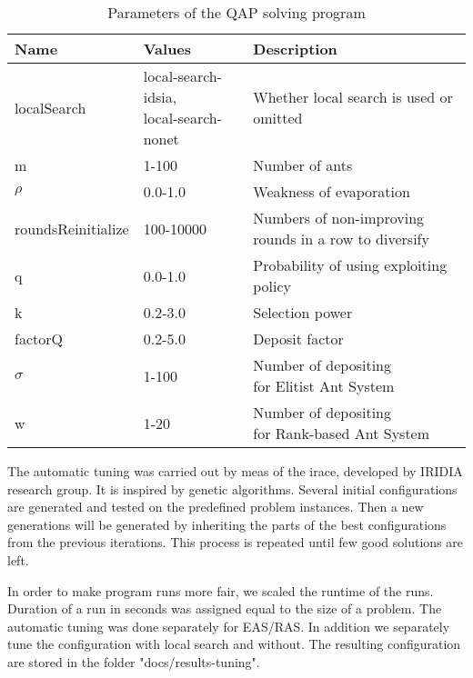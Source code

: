 \documentclass[12pt]{article}
\begin{document}
\begin{table}[H]
\centering
\caption{Parameters of the QAP solving program}
\label{tbl:parameters}
\begin{tabular}{|l|l|l|}
\hline
\textbf{Name}         & \textbf{Values}                       & \textbf{Description}                                  \\ \hline
localSearch           & \makecell{local-search-idsia,\\ local-search-nonet} & Whether local search is used or omitted               \\ \hline
m                     & 1-100                                 & Number of ants                                        \\ \hline
$\rho$   & 0.0-1.0                               & Weakness of evaporation                               \\ \hline
roundsReinitialize    & 100-10000                             & \makecell[l]{Numbers of non-improving \\rounds in a row to diversify} \\ \hline
q                     & 0.0-1.0                               & Probability of using exploiting policy                \\ \hline
k                     & 0.2-3.0                               & Selection power                                       \\ \hline
factorQ               & 0.2-5.0                               & Deposit factor                                        \\ \hline
$\sigma$ & 1-100                                 & \makecell[l]{Number of depositing \\for Elitist Ant System}           \\ \hline
w                     & 1-20                                  & \makecell[l]{Number of depositing \\for Rank-based Ant System}        \\ \hline
\end{tabular}
\end{table}

The automatic tuning was carried out by meas of the irace, developed by IRIDIA research group. It is inspired by genetic algorithms. Several initial configurations are generated and tested on the predefined problem instances. Then a new generations will be generated by inheriting the parts of the best configurations from the previous iterations. This process is repeated until few good solutions are left.

In order to make program runs more fair, we scaled the runtime of the runs. Duration of a run in seconds was assigned equal to the size of a problem. The automatic tuning was done separately for EAS/RAS. In addition we separately tune the configuration with local search and without. The resulting configuration are stored in the folder "docs/results-tuning".




\end{document}
